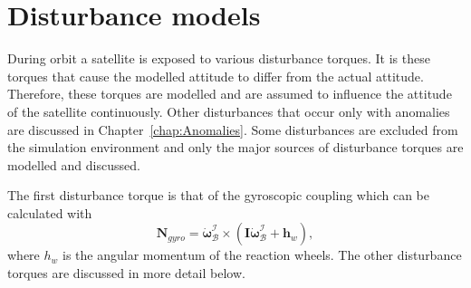 %	
%
%	

\section{Disturbance models}
\label{section: disturbance models}
During orbit a satellite is exposed to various disturbance torques. It is these torques that cause the modelled attitude to differ from the actual attitude. Therefore, these torques are modelled and are assumed to influence the attitude of the satellite continuously. Other disturbances that occur only with anomalies are discussed in Chapter~\ref{chap:Anomalies}. Some disturbances are excluded from the simulation environment and only the major sources of disturbance torques are modelled and discussed.

The first disturbance torque is that of the gyroscopic coupling which can be calculated with
\begin{equation}
\mathbf{N}_{gyro} = \boldsymbol{\dot{\omega}}_\mathcal{B}^\mathcal{I} \times (\mathbf{I}\boldsymbol{\dot{\omega}}_\mathcal{B}^\mathcal{I} + \mathbf{h}_w),
\end{equation}
where $h_w$ is the angular momentum of the reaction wheels. The other disturbance torques are discussed in more detail below.

